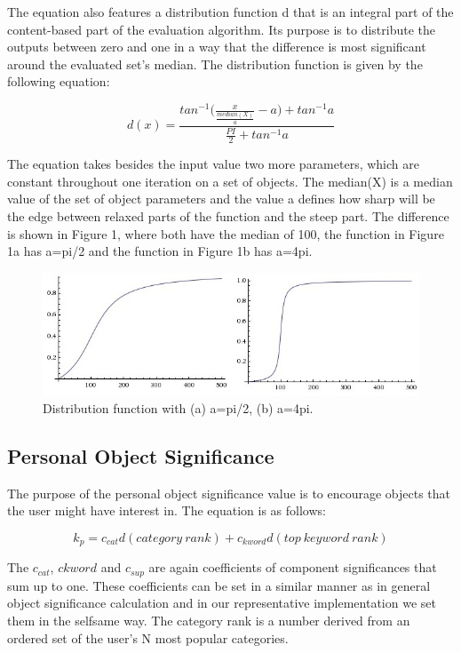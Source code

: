 \documentclass[6pt]{article}
\begin{document}
The equation also features a distribution function d that is an integral part of the content-based part of the evaluation algorithm. Its purpose is to distribute the outputs between zero and one in a way that the difference is most significant around the evaluated set’s median. The distribution function is given by the following equation:

\large $$d(x)=\frac{tan^{-1}\Big(\frac{x}{\frac{median(X)}{a}}-a\Big)+tan^{-1}a}{\frac{PI}{2}+tan^{-1}a}$$ \normalsize

The equation takes besides the input value two more parameters, which are constant throughout one iteration on a set of objects. The median(X) is a median value of the set of object parameters and the value a defines how sharp will be the edge between relaxed parts of the function and the steep part. The difference is shown in Figure 1, where both have the median of 100, the function in Figure 1a has a=pi/2 and the function in Figure 1b has a=4pi.

\begin{figure}[h]
\includegraphics[width=\textwidth]{images/fig.jpg}
\caption{Distribution function with (a) a=pi/2, (b) a=4pi.}
\end{figure}

\subsection{Personal Object Significance}
The purpose of the personal object significance value is to encourage objects that the user might have interest in. The equation is as follows:

$$k_p=c_{cat} d(category~rank)+c_{kword} d(top~keyword~rank) $$

The $c_{cat}$, $c{kword}$ and $c_{sup}$ are again coefficients of component significances that sum up to one. These coefficients can be set in a similar manner as in general object significance calculation and in our representative implementation we set them in the selfsame way. The category rank is a number derived from an ordered set of the user’s N most popular categories.
\end{document}
